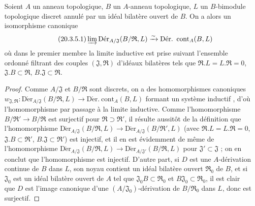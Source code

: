 \begin{proposition}[20.3.5]
\label{0.20.3.5-fr}
Soient $A$ un anneau topologique, $B$ un $A$-anneau topologique, $L$ un
$B$-bimodule topologique discret annulé par un idéal bilatère ouvert de $B$.
On a alors un isomorphisme canonique
\begin{equation}
\tag{20.3.5.1}
\label{0.20.3.5.1-fr}
  \varinjlim\operatorname{D\acute{e}r}_{A/\mathfrak{J}}
  (B/\mathfrak{R},L)\xrightarrow{\sim}
  \operatorname{D\acute{e}r.\ cont}_A(B,L)
\end{equation}
où dans le premier membre la limite inductive est prise suivant l'ensemble
ordonné filtrant des couples $(\mathfrak{J},\mathfrak{R})$ d'idéaux bilatères
tels que $\mathfrak{R}.L=L.\mathfrak{R}=0$,
$\mathfrak{J}.B\subset\mathfrak{R}$,
$B.\mathfrak{J}\subset\mathfrak{R}$.
\end{proposition}

\begin{proof}
Comme $A/\mathfrak{J}$ et $B/\mathfrak{R}$ sont discrets, on a des
homomorphismes canoniques
$w_{\mathfrak{J},\mathfrak{R}}:
\operatorname{D\acute{e}r}_{A/\mathfrak{J}}(B/\mathfrak{R},L)\to
\operatorname{D\acute{e}r.\ cont}_A(B,L)$ formant un système inductif
, d'où l'homomorphisme  par passage à
la limite inductive. Comme l'homomorphisme
$B/\mathfrak{R}'\to B/\mathfrak{R}$ est surjectif pour
$\mathfrak{R}\supset\mathfrak{R}'$, il résulte aussitôt de la définition que
l'homomorphisme
$\operatorname{D\acute{e}r}_{A/\mathfrak{J}}(B/\mathfrak{R},L)\to
\operatorname{D\acute{e}r}_{A/\mathfrak{J}}(B/\mathfrak{R}',L)$ (avec
$\mathfrak{R}.L=L.\mathfrak{R}=0$,
$\mathfrak{J}.B\subset\mathfrak{R}'$,
$B.\mathfrak{J}\subset\mathfrak{R}'$) est injectif, et il en est évidemment
de même de l'homomorphisme
$\operatorname{D\acute{e}r}_{A/\mathfrak{J}}(B/\mathfrak{R},L)\to
\operatorname{D\acute{e}r}_{A/\mathfrak{J}'}(B/\mathfrak{R},L)$ pour
$\mathfrak{J}'\subset\mathfrak{J}$  ; on en conclut que
l'homomorphisme  est injectif. D'autre part, si $D$ est
une $A$-dérivation continue de $B$ dans $L$, son noyau contient un idéal
bilatère ouvert $\mathfrak{R}_0$ de $B$, et si $\mathfrak{J}_0$ est un idéal
bilatère ouvert de $A$ tel que $\mathfrak{J}_0B\subset\mathfrak{R}_0$ et
$B\mathfrak{J}_0\subset\mathfrak{R}_0$, il est clair que $D$ est l'image
canonique d'une $(A/\mathfrak{J}_0)$-dérivation de
$B/\mathfrak{R}_0$ dans $L$, donc  est surjectif.
\end{proof}

